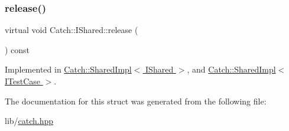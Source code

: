 \hypertarget{struct_catch_1_1_i_shared_a002f52624728a763956fb6f230cb2f57}{}\label{struct_catch_1_1_i_shared_a002f52624728a763956fb6f230cb2f57} 
\subsubsection{\texorpdfstring{release()}{release()}}
{\footnotesize\ttfamily virtual void Catch\+::\+I\+Shared\+::release (\begin{DoxyParamCaption}{ }\end{DoxyParamCaption}) const\hspace{0.3cm}{\ttfamily [pure virtual]}}



Implemented in \hyperlink{struct_catch_1_1_shared_impl_ada8052c6f24fd73ec099333626f106fe}{Catch\+::\+Shared\+Impl$<$ I\+Shared $>$}, and \hyperlink{struct_catch_1_1_shared_impl_ada8052c6f24fd73ec099333626f106fe}{Catch\+::\+Shared\+Impl$<$ I\+Test\+Case $>$}.



The documentation for this struct was generated from the following file\+:\begin{DoxyCompactItemize}
\item 
lib/\hyperlink{catch_8hpp}{catch.\+hpp}\end{DoxyCompactItemize}
